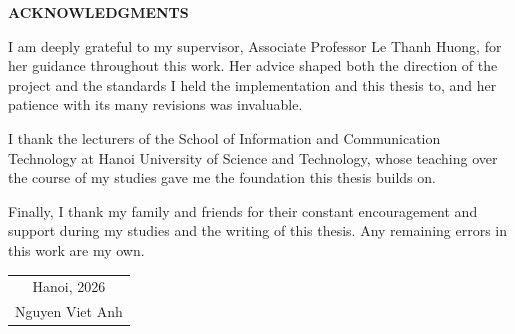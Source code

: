 \documentclass[../main.tex]{subfiles}
\begin{document}
\begin{center}
    \Large{\textbf{ACKNOWLEDGMENTS}}\\
\end{center}
\vspace{1cm}

I am deeply grateful to my supervisor, Associate Professor Le Thanh Huong, for her guidance throughout this work.
Her advice shaped both the direction of the project and the standards I held the implementation and this thesis to, and her patience with its many revisions was invaluable.

I thank the lecturers of the School of Information and Communication Technology at Hanoi University of Science and Technology, whose teaching over the course of my studies gave me the foundation this thesis builds on.

Finally, I thank my family and friends for their constant encouragement and support during my studies and the writing of this thesis.
Any remaining errors in this work are my own.

\begin{flushright}
\begin{tabular}{@{}c@{}}
Hanoi, 2026\\[0.5cm]
Nguyen Viet Anh
\end{tabular}
\end{flushright}
\end{document}
